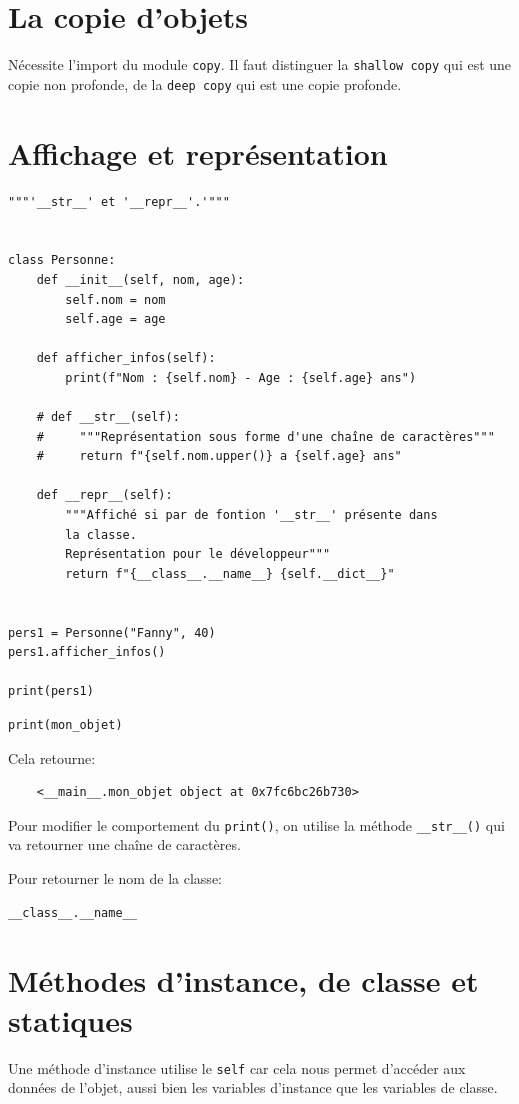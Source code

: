 \documentclass[a4paper,11pt]{book}
\begin{document}
\section{La copie d'objets}
Nécessite l'import du module \texttt{copy}. Il faut distinguer la \texttt{shallow copy} qui est une copie non profonde, de la \texttt{deep copy} qui est une copie profonde.
\medskip

\section{Affichage et représentation}
\begin{lstlisting}
"""'__str__' et '__repr__'.'"""


class Personne:
    def __init__(self, nom, age):
        self.nom = nom
        self.age = age

    def afficher_infos(self):
        print(f"Nom : {self.nom} - Age : {self.age} ans")

    # def __str__(self):
    #     """Représentation sous forme d'une chaîne de caractères"""
    #     return f"{self.nom.upper()} a {self.age} ans"

    def __repr__(self):
        """Affiché si par de fontion '__str__' présente dans 
        la classe.
        Représentation pour le développeur"""
        return f"{__class__.__name__} {self.__dict__}"


pers1 = Personne("Fanny", 40)
pers1.afficher_infos()

print(pers1)
\end{lstlisting}
\medskip

\begin{lstlisting}
print(mon_objet)
\end{lstlisting}
\medskip

Cela retourne:
\begin{verbatim}
    <__main__.mon_objet object at 0x7fc6bc26b730>
\end{verbatim}
\medskip

Pour modifier le comportement du \texttt{print()}, on utilise la méthode \texttt{\_\_str\_\_()} qui va retourner une chaîne de caractères.
\medskip

Pour retourner le nom de la classe:
\begin{lstlisting}
__class__.__name__
\end{lstlisting}
\medskip

\section{Méthodes d'instance, de classe et statiques}
Une méthode d'instance utilise le \texttt{self} car cela nous permet d'accéder aux données de l'objet, aussi bien les variables d'instance que les variables de classe.
\medskip
\end{document}
